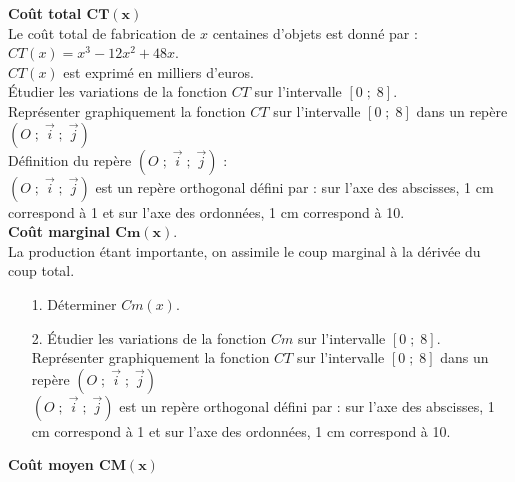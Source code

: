 \textbf{Coût total $\mathbf{CT(x)}$} \\

Le coût total de fabrication de $x$ centaines d'objets est donné par : $CT(x) = x^3 - 12x^2 + 48x$. \\
$CT(x)$ est exprimé en milliers d'euros. \\

Étudier les variations de la fonction $CT$ sur l'intervalle $\left[0\; ; \; 8\right]$. \\

Représenter graphiquement la fonction $CT$ sur l'intervalle $\left[0\; ; \; 8\right]$ dans un repère $\left(O \; ; \; \overrightarrow{i} \; ; \; \overrightarrow{j}\right)$ \\

Définition du repère $\left(O \; ; \; \overrightarrow{i} \; ; \; \overrightarrow{j}\right)$ : \\

$\left(O \; ; \; \overrightarrow{i} \; ; \; \overrightarrow{j}\right)$ est un repère orthogonal défini par : sur l'axe des abscisses, 1 cm correspond à 1 et sur l'axe des ordonnées, 1 cm correspond à 10. \\

\textbf{Coût marginal $\mathbf{Cm(x)}$}. \\

La production étant importante, on assimile le coup marginal à la dérivée du coup total. \\

\begin{itemize}
\item[1.] Déterminer $Cm(x)$. \\
\item[2.] Étudier les variations de la fonction $Cm$ sur l'intervalle $\left[0\; ; \; 8\right]$. \\

Représenter graphiquement la fonction $CT$ sur l'intervalle $\left[0\; ; \; 8\right]$ dans un repère $\left(O \; ; \; \overrightarrow{i} \; ; \; \overrightarrow{j}\right)$ \\

$\left(O \; ; \; \overrightarrow{i} \; ; \; \overrightarrow{j}\right)$ est un repère orthogonal défini par : sur l'axe des abscisses, 1 cm correspond à 1 et sur l'axe des ordonnées, 1 cm correspond à 10. \\
\end{itemize}

\textbf{Coût moyen $\mathbf{CM(x)}$} \\

